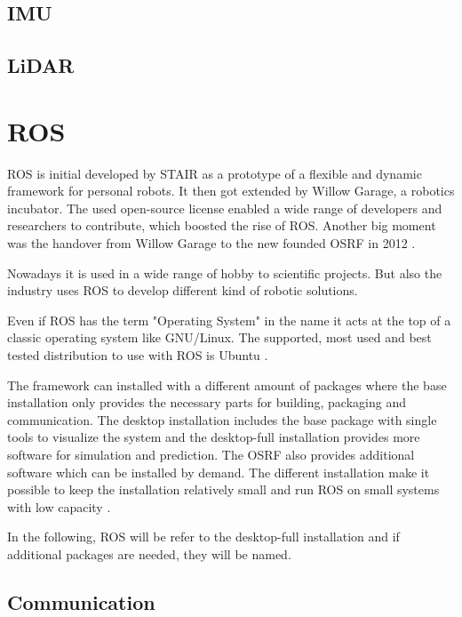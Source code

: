 	\subsection{IMU}\label{ssec:HWIMU}

	\subsection{LiDAR}\label{ssec:HWLiDAR}

\section{ROS}\label{sec:ros}
\ac{ROS} is initial developed by \ac{STAIR} as a prototype of a flexible and dynamic framework for personal robots.
It then got extended by Willow Garage, a robotics incubator.
The used open-source license enabled a wide range of developers and researchers to contribute, which boosted the rise of \ac{ROS}.
Another big moment was the handover from Willow Garage to the new founded \ac{OSRF} in 2012 \cite{rosHistory}.

Nowadays it is used in a wide range of hobby to scientific projects.
But also the industry uses \ac{ROS} to develop different kind of robotic solutions.

Even if \ac{ROS} has the term "Operating System" in the name it acts at the top of a classic operating system like GNU/Linux.
The supported, most used and best tested distribution to use with \ac{ROS} is Ubuntu \cite{rosInstallationOS}.

The framework can installed with a different amount of packages where the base installation only provides the necessary parts for building, packaging and communication.
The desktop installation includes the base package with single tools to visualize the system and the desktop-full installation provides more software for simulation and prediction.
The \ac{OSRF} also provides additional software which can be installed by demand.
The different installation make it possible to keep the installation relatively small and run \ac{ROS} on small systems with low capacity \cite{rosInstallations}.

In the following, \ac{ROS} will be refer to the desktop-full installation and if additional packages are needed, they will be named.

\subsection{Communication}\label{ssec:communication}

